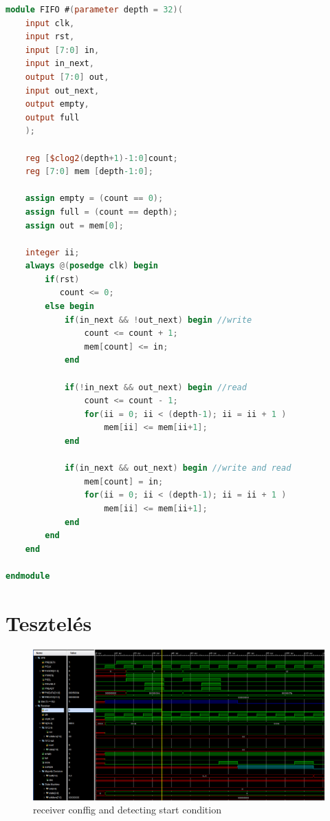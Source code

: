 \begin{lstlisting}[frame=single,language=verilog,caption={FIFO verilog modul},captionpos=b,label={lst:fifo}]
module FIFO #(parameter depth = 32)(
    input clk,
    input rst,
    input [7:0] in,
    input in_next,
    output [7:0] out,
    input out_next,
    output empty,
    output full
    );
    
    reg [$clog2(depth+1)-1:0]count;
    reg [7:0] mem [depth-1:0];
    
    assign empty = (count == 0);
    assign full = (count == depth);
    assign out = mem[0];
    
    integer ii;
    always @(posedge clk) begin
        if(rst)
           count <= 0;
        else begin            
            if(in_next && !out_next) begin //write
                count <= count + 1;
                mem[count] <= in;
            end
            
            if(!in_next && out_next) begin //read
                count <= count - 1;
                for(ii = 0; ii < (depth-1); ii = ii + 1 )
                    mem[ii] <= mem[ii+1];
            end
            
            if(in_next && out_next) begin //write and read
                mem[count] = in;                
                for(ii = 0; ii < (depth-1); ii = ii + 1 )
                    mem[ii] <= mem[ii+1];
            end
        end
    end
    
endmodule
\end{lstlisting}
\section{Tesztelés}


\begin{figure}[h]
\vspace{0.5cm}
\begin{center}
\includegraphics[width=\textwidth]{figures/sim1.png}
\caption{receiver conffig and detecting start condition}
\label{fig:sim1}
\end{center}
\vspace{0.5cm}
\end{figure}


